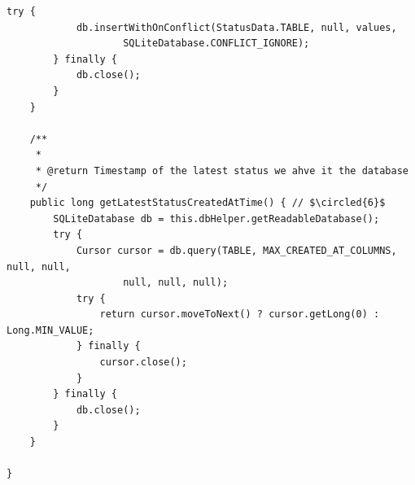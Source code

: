 \begin{frame}
\begin{lstlisting}[caption=src/com/artemisa/yamba/StatusData.java, basicstyle=\tiny,escapechar= $]
		try {
			db.insertWithOnConflict(StatusData.TABLE, null, values,
					SQLiteDatabase.CONFLICT_IGNORE);
		} finally {
			db.close();
		}
	}

	/**
	 * 
	 * @return Timestamp of the latest status we ahve it the database
	 */
	public long getLatestStatusCreatedAtTime() { // $\circled{6}$
		SQLiteDatabase db = this.dbHelper.getReadableDatabase();
		try {
			Cursor cursor = db.query(TABLE, MAX_CREATED_AT_COLUMNS, null, null,
					null, null, null);
			try {
				return cursor.moveToNext() ? cursor.getLong(0) : Long.MIN_VALUE;
			} finally {
				cursor.close();
			}
		} finally {
			db.close();
		}
	}

}

\end{lstlisting}
\end{frame}
